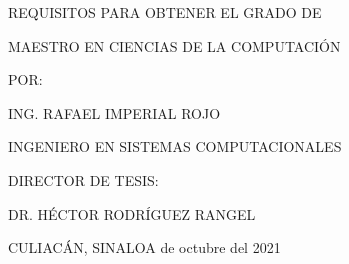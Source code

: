 \begin{titlepage}
\begin{center}
        {\fontsize{11}{30}\selectfont {} REQUISITOS PARA OBTENER EL GRADO DE}
        
        \vspace{0.5cm}
        {\fontsize{14}{30}\selectfont MAESTRO EN CIENCIAS DE LA COMPUTACIÓN}
        
        
        \vspace{0.5cm}
        
        {\fontsize{14}{30}\selectfont POR:}
        
        \vspace{0.5cm}
        {\fontsize{11}{30}\selectfont ING. RAFAEL IMPERIAL ROJO}
        
        
        {\fontsize{14}{30}\selectfont INGENIERO EN SISTEMAS COMPUTACIONALES }
        
        
        \vspace{0.5cm}
        {\fontsize{14}{30}\selectfont DIRECTOR DE TESIS:}
        
        {\fontsize{11}{30}\selectfont DR. HÉCTOR RODRÍGUEZ RANGEL}
        
        \vspace{2.5cm}
        {\fontsize{14}{30}\selectfont CULIACÁN, SINALOA} \hfill {\fontsize{14}{30} de octubre del 2021}
        
        
    \end{center}

\end{titlepage}